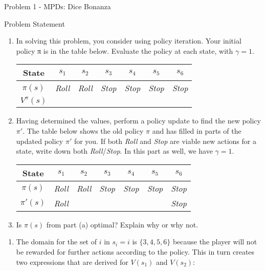 \begin{problem}{Problem 1 - MPDs: Dice Bonanza}
\begin{statement}{Problem Statement}
        \begin{enumerate}[label=(\alph*)]
            \item In solving this problem, you consider using policy iteration. Your initial policy π is in the table below. Evaluate the policy at each state, with $\gamma = 1$.
            \begin{center}
                \begin{tabular}[ht]{|c|c|c|c|c|c|c|}
                    \hline State & $s_{1}$ & $s_{2}$ & $s_{3}$ & $s_{4}$ & $s_{5}$ & $s_{6}$ \\ \hline
                    $\pi(s)$ & \textit{Roll} & \textit{Roll} & \textit{Stop} & \textit{Stop} & \textit{Stop} & \textit{Stop} \\ \hline
                    $V^{\pi}(s)$ & & & & & & \\ \hline
                \end{tabular}
            \end{center}
            \item Having determined the values, perform a policy update to find the new policy $\pi'$. The table below shows the old policy $\pi$ and has filled in parts of the updated policy $\pi'$ 
            for you. If both \textit{Roll} and \textit{Stop} are viable new actions for a state, write down both \textit{Roll}/\textit{Stop}. In this part as well, we have $\gamma = 1$.
            \begin{center}
                \begin{tabular}[ht]{|c|c|c|c|c|c|c|}
                    \hline State & $s_{1}$ & $s_{2}$ & $s_{3}$ & $s_{4}$ & $s_{5}$ & $s_{6}$ \\ \hline
                    $\pi(s)$ & \textit{Roll} & \textit{Roll} & \textit{Stop} & \textit{Stop} & \textit{Stop} & \textit{Stop} \\ \hline
                    $\pi'(s)$ & \textit{Roll} & & & & & \textit{Stop} \\ \hline
                \end{tabular}
            \end{center}
            \item Is $\pi(s)$ from part (a) optimal? Explain why or why not.
        \end{enumerate}
    \end{statement}

    \newpage

    \begin{highlight}
        \begin{enumerate}[label=(\alph*)]
            \item The domain for the set of $i$ in $s_{i} = i$ is $\{3,4,5,6\}$ because the player will not be rewarded for further actions according to the policy. This in turn creates two expressions
            that are derived for $V(s_{1})$ and $V(s_{2})$:


\end{enumerate}
\end{highlight}
\end{problem}
